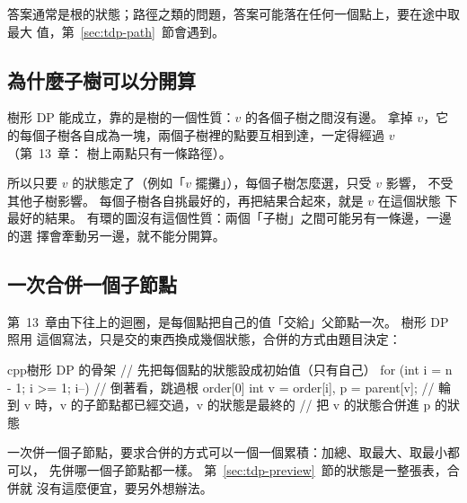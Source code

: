 答案通常是根的狀態；路徑之類的問題，答案可能落在任何一個點上，要在途中取最大
值，第~\ref{sec:tdp-path}~節會遇到。

\subsection{為什麼子樹可以分開算}

樹形 DP 能成立，靠的是樹的一個性質：$v$ 的各個子樹之間沒有邊。 拿掉 $v$，它
的每個子樹各自成為一塊，兩個子樹裡的點要互相到達，一定得經過 $v$（第~13~章：
樹上兩點只有一條路徑）。

\begin{center}
\label{fig:tdp-indep}
\end{center}

所以只要 $v$ 的狀態定了（例如「$v$ 擺攤」），每個子樹怎麼選，只受 $v$ 影響，
不受其他子樹影響。 每個子樹各自挑最好的，再把結果合起來，就是 $v$ 在這個狀態
下最好的結果。 有環的圖沒有這個性質：兩個「子樹」之間可能另有一條邊，一邊的選
擇會牽動另一邊，就不能分開算。

\subsection{一次合併一個子節點}

第~13~章由下往上的迴圈，是每個點把自己的值「交給」父節點一次。 樹形 DP 照用
這個寫法，只是交的東西換成幾個狀態，合併的方式由題目決定：

\begin{code}{cpp}{樹形 DP 的骨架}
// 先把每個點的狀態設成初始值（只有自己）
for (int i = n - 1; i >= 1; i--) {      // 倒著看，跳過根 order[0]
    int v = order[i], p = parent[v];
    // 輪到 v 時，v 的子節點都已經交過，v 的狀態是最終的
    // 把 v 的狀態合併進 p 的狀態
}
\end{code}

一次併一個子節點，要求合併的方式可以一個一個累積：加總、取最大、取最小都可以，
先併哪一個子節點都一樣。 第~\ref{sec:tdp-preview}~節的狀態是一整張表，合併就
沒有這麼便宜，要另外想辦法。

